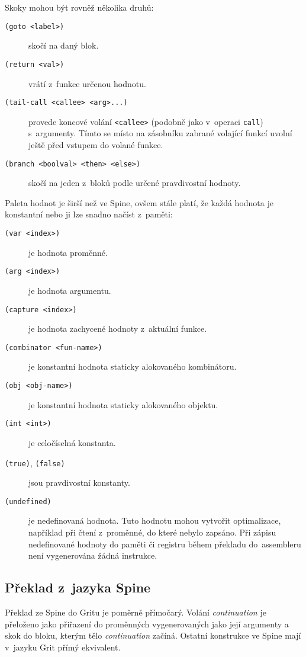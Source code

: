 Skoky mohou být rovněž několika druhů:

\begin{description}
  \item[\texttt{(goto <label>)}] skočí na daný blok.
  \item[\texttt{(return <val>)}] vrátí z~funkce určenou hodnotu.
  \item[\texttt{(tail-call <callee> <arg>...)}] provede koncové volání
    \texttt{<callee>} (podobně jako v~operaci \texttt{call}) s~argumenty. Tímto
    se místo na zásobníku zabrané volající funkcí uvolní ještě před vstupem do
    volané funkce.
  \item[\texttt{(branch <boolval> <then> <else>)}] skočí na jeden z~bloků podle
    určené pravdivostní hodnoty.
\end{description}

Paleta hodnot je širší než ve Spine, ovšem stále platí, že každá hodnota je
konstantní nebo ji lze snadno načíst z~paměti:

\begin{description}
  \item[\texttt{(var <index>)}] je hodnota proměnné.
  \item[\texttt{(arg <index>)}] je hodnota argumentu.
  \item[\texttt{(capture <index>)}] je hodnota zachycené hodnoty z~aktuální funkce.
  \item[\texttt{(combinator <fun-name>)}] je konstantní hodnota staticky
    alokovaného kombinátoru.
  \item[\texttt{(obj <obj-name>)}] je konstantní hodnota staticky alokovaného
    objektu.
  \item[\texttt{(int <int>)}] je celočíselná konstanta.
  \item[\texttt{(true)}, \texttt{(false)}] jsou pravdivostní konstanty.
  \item[\texttt{(undefined)}] je nedefinovaná hodnota. Tuto hodnotu mohou
    vytvořit optimalizace, například při čtení z~proměnné, do které nebylo
    zapsáno. Při zápisu nedefinované hodnoty do paměti či registru během
    překladu do~assembleru není vygenerována žádná instrukce.
\end{description}

\subsection{Překlad z~jazyka Spine}

Překlad ze Spine do Gritu je poměrně přímočarý. Volání \emph{continuation} je
přeloženo jako přiřazení do proměnných vygenerovaných jako její argumenty a skok
do bloku, kterým tělo \emph{continuation} začíná. Ostatní konstrukce ve Spine
mají v~jazyku Grit přímý ekvivalent.


